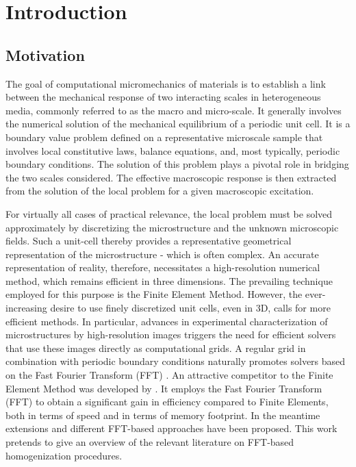 \chapter{Introduction}

\section{Motivation}

The goal of computational micromechanics of materials is to establish a link between the mechanical response of two interacting scales in heterogeneous media, commonly referred to as the macro and micro-scale.
It generally involves the numerical solution of the mechanical equilibrium of a periodic unit cell.
It is a boundary value problem defined on a representative microscale sample that involves local constitutive laws, balance equations, and, most typically, periodic boundary conditions.
The solution of this problem plays a pivotal role in bridging the two scales considered.
The effective macroscopic response is then extracted from the solution of the local problem for a given macroscopic excitation.

For virtually all cases of practical relevance, the local problem must be solved approximately by discretizing the microstructure and the unknown microscopic fields.
Such a unit-cell thereby provides a representative geometrical representation of the microstructure - which is often complex.
An accurate representation of reality, therefore, necessitates a high-resolution numerical method, which remains efficient in three dimensions.
The prevailing technique employed for this purpose is the Finite Element Method.
However, the ever-increasing desire to use finely discretized unit cells, even in 3D, calls for more efficient methods.
In particular, advances in experimental characterization of microstructures by high-resolution images triggers the need for efficient solvers that use these images directly as computational grids.
A regular grid in combination with periodic boundary conditions naturally promotes solvers based on the Fast Fourier Transform (FFT) \citep{zeman_finite_2017, de_geus_finite_2017}.
An attractive competitor to the Finite Element Method was developed by \cite{moulinec_fast_1994, moulinec_fft-based_1995}.
It employs the Fast Fourier Transform (FFT) to obtain a significant gain in efficiency compared to Finite Elements, both in terms of speed and in terms of memory footprint.
In the meantime extensions and different FFT-based approaches have been proposed.
This work pretends to give an overview of the relevant literature on FFT-based homogenization procedures.

